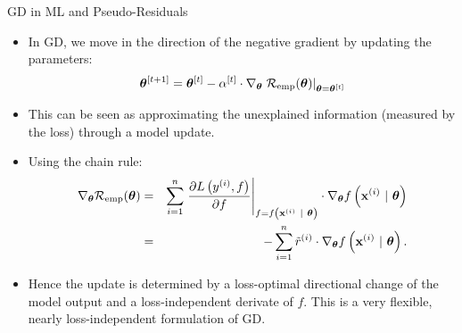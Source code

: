 \documentclass[11pt,compress,t,notes=noshow, xcolor=table]{beamer}
\begin{document}
\begin{vbframe}{GD in ML and Pseudo-Residuals}

\begin{itemize}
	\item In GD, we move in the direction of the negative gradient by updating the parameters: 
	$$
	 \bm{\theta}^{[t + 1]} = \bm{\theta}^{[t]} - \alpha^{[t]} \cdot \nabla_{\bm{\theta}} \left.\mathcal{R}_{\text{emp}}(\bm{\theta})\right|_{\bm{\theta} = \bm{\theta}^{[t]}}	
	$$
	\item This can be seen as approximating the unexplained information (measured by the loss) through a model update. 
	\item Using the chain rule:
	\begin{eqnarray*}
	\nabla_{\bm{\theta}} \mathcal{R}_{\text{emp}}(\bm{\theta}) &=&\sum\limits_{i=1}^n \left.\frac{\partial L\left(y^{(i)}, f\right)}{\partial f} \right|_{f = f\left(\mathbf{x}^{(i)} ~|~ \bm{\theta}\right)} 
	\cdot \nabla_{\bm{\theta}} f\left(\mathbf{x}^{(i)} ~|~ \bm{\theta}\right) \\ 
	&=& - \sum\limits_{i=1}^n \tilde r^{(i)} \cdot \nabla_{\bm{\theta}} f\left(\mathbf{x}^{(i)} ~|~ \bm{\theta}\right).
	\end{eqnarray*}
	\item Hence the update is determined by a loss-optimal directional change of the model output 
        and a loss-independent derivate of $f$.
        This is a very flexible, nearly loss-independent formulation of GD.
\end{itemize}	

\end{vbframe}


\endlecture
\end{document}
